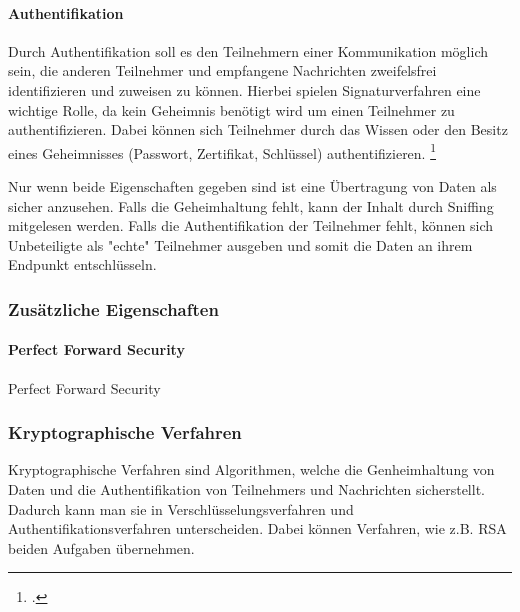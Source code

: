             \paragraph{Authentifikation}
                Durch Authentifikation soll es den Teilnehmern einer Kommunikation möglich sein, die anderen Teilnehmer und empfangene Nachrichten zweifelsfrei identifizieren und zuweisen zu können. Hierbei spielen Signaturverfahren eine wichtige Rolle, da kein Geheimnis benötigt wird um einen Teilnehmer zu authentifizieren. Dabei können sich Teilnehmer durch das Wissen oder den Besitz eines Geheimnisses (Passwort, Zertifikat, Schlüssel) authentifizieren. \footcite[2]{BSW.2015}

        Nur wenn beide Eigenschaften gegeben sind ist eine Übertragung von Daten als sicher anzusehen. Falls die Geheimhaltung fehlt, kann der Inhalt durch Sniffing mitgelesen werden. Falls die Authentifikation der Teilnehmer fehlt, können sich Unbeteiligte als "echte" Teilnehmer ausgeben und somit die Daten an ihrem Endpunkt entschlüsseln.

        \subsubsection{Zusätzliche Eigenschaften}
            \paragraph{Perfect Forward Security} Perfect Forward Security

        \subsubsection{Kryptographische Verfahren}
            Kryptographische Verfahren sind Algorithmen, welche die Genheimhaltung von Daten und die Authentifikation von Teilnehmers und Nachrichten sicherstellt. Dadurch kann man sie in Verschlüsselungsverfahren und Authentifikationsverfahren unterscheiden. Dabei können Verfahren, wie z.B. \ac{RSA} beiden Aufgaben übernehmen.
